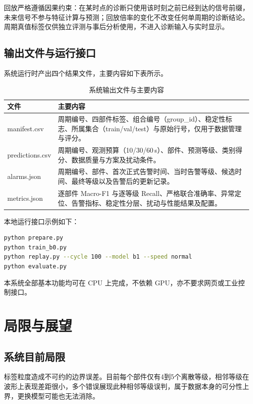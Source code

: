 \documentclass[12pt, a4paper]{ctexart}
\begin{document}
回放严格遵循因果约束：在某时点的诊断只使用该时刻之前已经到达的信号前缀，未来信号不参与特征计算与预测；回放倍率的变化不改变任何单周期的诊断结论。周期真值标签仅供独立评测与事后分析使用，不进入诊断输入与实时显示。

\subsection{输出文件与运行接口}
系统运行时产出四个结果文件，主要内容如下表所示。
\begin{table}[H]
  \centering
  \caption{系统输出文件与主要内容}
  \label{tab:outputs}
  \small
  \begin{tabular}{@{}p{3.0cm}p{10.8cm}@{}}
    \toprule
    \textbf{文件} & \textbf{主要内容} \\
    \midrule
    manifest.csv & 周期编号、四部件标签、组合编号（group\_id）、稳定性标志、所属集合（train/val/test）与原始行号，仅用于数据管理与评分。 \\
    \addlinespace
    predictions.csv & 周期编号、观测预算（10/30/60\,s）、部件、预测等级、类别得分、数据质量与方案及扰动条件。 \\
    \addlinespace
    alarms.json & 周期编号、部件、首次正式告警时间、当时告警等级、候选时间、最终等级以及告警后的更新记录。 \\
    \addlinespace
    metrics.json & 逐部件 Macro-F1 与逐等级 Recall、严格联合准确率、异常定位、告警指标、稳定性分层、扰动与性能结果及配置。 \\
    \bottomrule
  \end{tabular}
\end{table}

本地运行接口示例如下：
\begin{lstlisting}[language=bash, caption=本地运行接口示例]
python prepare.py 
python train_b0.py
python replay.py --cycle 100 --model b1 --speed normal
python evaluate.py
\end{lstlisting}
本系统全部基本功能均可在 CPU 上完成，不依赖 GPU，亦不要求网页或工业控制接口。

\section{局限与展望}
\subsection{系统目前局限}
标签粒度造成不可约的边界误差。目前每个部件仅有4到5个离散等级，相邻等级在波形上表现差距很小，多个错误展现此种相邻等级误判，属于数据本身的可分性上界，更换模型可能也无法消除。
\end{document}
